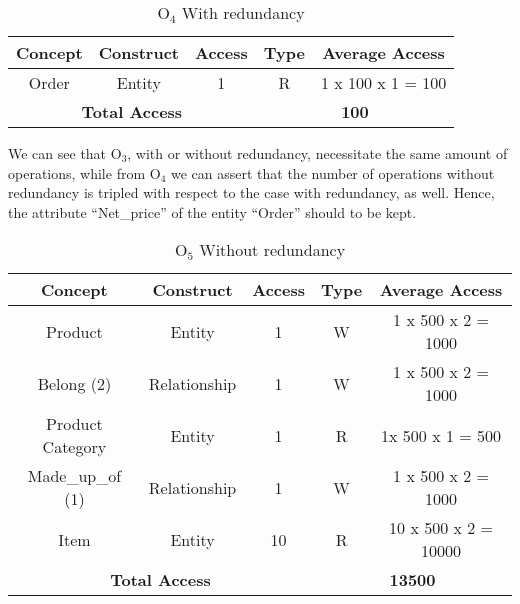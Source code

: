 \begin{table}[!h]\caption{	$ \textrm{O}_\textrm{4} $ With redundancy }
	\begin{center}
		\begin{tabular}{| c | c | c | c | c |}
			\hline
			\textbf{Concept} & \textbf{Construct} & \textbf{Access} & \textbf{Type} & \textbf{Average Access} \\ \hline
			Order & Entity & 1 & R & 1 x 100 x 1 = 100 \\ \hline
			\multicolumn{3}{|c|}{\textbf{Total Access}} & \multicolumn{2}{|c|}{\textbf{100}} \\ \hline
		\end{tabular}
	\end{center}
\end{table}
\newpage
We can see that $ \textrm{O}_\textrm{3} $, with or without redundancy, necessitate the same amount of operations, while from $ \textrm{O}_\textrm{4} $ we can assert that the number of operations without redundancy is tripled with respect to the case with redundancy, as well. Hence, the attribute ``Net\_price'' of the entity ``Order'' should to be kept.
\begin{table}[!h]\caption{	$ \textrm{O}_\textrm{5} $ Without redundancy }
	\begin{center}
		\begin{tabular}{| c | c | c | c | c |}
			\hline
			\textbf{Concept} & \textbf{Construct} & \textbf{Access} & \textbf{Type} & \textbf{Average Access} \\ \hline
			Product & Entity & 1 & W & 1 x 500 x 2 = 1000 \\ \hline
			Belong (2) & Relationship & 1 & W & 1 x 500 x 2 = 1000 \\ \hline
			Product Category & Entity & 1 & R & 1x 500 x 1 = 500 \\ \hline
			Made\_up\_of (1) & Relationship & 1 & W & 1 x 500 x 2 = 1000 \\ \hline
			Item & Entity & 10 & R & 10 x 500 x 2 = 10000 \\ \hline
			\multicolumn{3}{|c|}{\textbf{Total Access}} & \multicolumn{2}{|c|}{\textbf{13500}} \\ \hline
		\end{tabular}
	\end{center}
\end{table}
